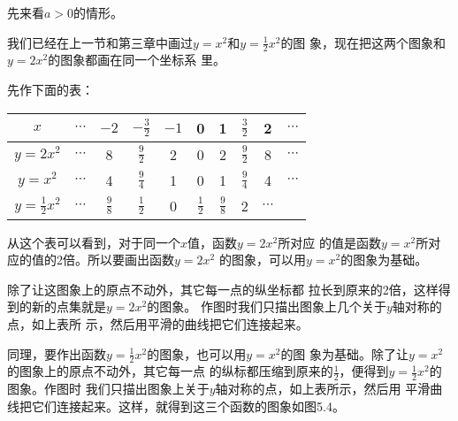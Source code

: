 先来看$a>0$的情形。

我们已经在上一节和第三章中画过$y=x^2$和$y=\frac{1}{2}x^2$的图
象，现在把这两个图象和$y=2x^2$的图象都画在同一个坐标系
里。

先作下面的表：
\begin{center}
\begin{tabular}{c|ccccccccc}
    \hline
$x$ &$\cdots$ & $-2$  & $-\tfrac{3}{2}$  & $-1$   & 0   & 1&$\tfrac{3}{2}$& 2&$\cdots$\\
\hline
$y=2x^2$ &$\cdots$ & 8&$\tfrac{9}{2}$ &2  & 0   & 2&$\tfrac{9}{2}$ &8&$\cdots$\\
$y=x^2$ &$\cdots$ & 4&$\tfrac{9}{4}$&1  & 0   & 1&$\tfrac{9}{4}$&4&$\cdots$\\
$y=\tfrac{1}{2}x^2$ &$\cdots$ & $\tfrac{9}{8}$&$\tfrac{1}{2}$  & 0   & $\tfrac{1}{2}$  & $\tfrac{9}{8}$&2&$\cdots$\\
\hline
\end{tabular}    
\end{center}

\begin{figure}[htp]
    \centering
{}
    \caption{}
\end{figure}

从这个表可以看到，对于同一个$x$值，函数$y=2x^2$所对应
的值是函数$y=x^2$所对应的值的2倍。所以要画出函数$y=2x^2$
的图象，可以用$y=x^2$的图象为基础。

除了让这图象上的原点不动外，其它每一点的纵坐标都
拉长到原来的2倍，这样得到的新的点集就是$y=2x^2$的图象。
作图时我们只描出图象上几个关于$y$轴对称的点，如上表所
示，然后用平滑的曲线把它们连接起来。

同理，要作出函数$y=\frac{1}{2}x^2$的图象，也可以用$y=x^2$的图
象为基础。除了让$y=x^2$的图象上的原点不动外，其它每一点
的纵标都压缩到原来的$\frac{1}{2}$，便得到$y=\frac{1}{2}x^2$的图象。作图时
我们只描出图象上关于$y$轴对称的点，如上表所示，然后用
平滑曲线把它们连接起来。这样，就得到这三个函数的图象如图5.4。

